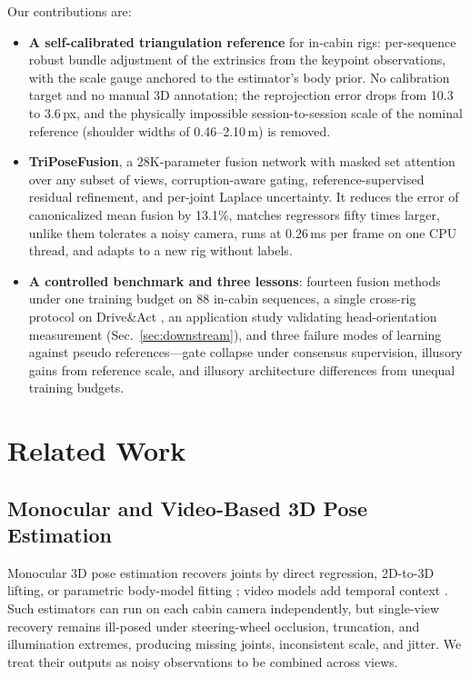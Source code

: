 \documentclass[journal]{IEEEtran}
\newcommand{\method}{TriPoseFusion}
\newcommand{\da}{Drive\&Act}
\begin{document}
Our contributions are:
\begin{itemize}
\item \textbf{A self-calibrated triangulation reference} for in-cabin rigs: per-sequence robust bundle adjustment of the extrinsics from the keypoint observations, with the scale gauge anchored to the estimator's body prior. No calibration target and no manual 3D annotation; the reprojection error drops from 10.3 to 3.6\,px, and the physically impossible session-to-session scale of the nominal reference (shoulder widths of 0.46--2.10\,m) is removed.
\item \textbf{\method{}}, a 28K-parameter fusion network with masked set attention over any subset of views, corruption-aware gating, reference-supervised residual refinement, and per-joint Laplace uncertainty. It reduces the error of canonicalized mean fusion by 13.1\%, matches regressors fifty times larger, unlike them tolerates a noisy camera, runs at 0.26\,ms per frame on one CPU thread, and adapts to a new rig without labels.
\item \textbf{A controlled benchmark and three lessons}: fourteen fusion methods under one training budget on 88 in-cabin sequences, a single cross-rig protocol on \da{} \cite{martin2019drive}, an application study validating head-orientation measurement (Sec.~\ref{sec:downstream}), and three failure modes of learning against pseudo references---gate collapse under consensus supervision, illusory gains from reference scale, and illusory architecture differences from unequal training budgets.
\end{itemize}

\section{Related Work}
\label{sec:related}

\subsection{Monocular and Video-Based 3D Pose Estimation}
Monocular 3D pose estimation recovers joints by direct regression, 2D-to-3D lifting, or parametric body-model fitting \cite{toshev2014deeppose,martinez2017simple,zhou2017towards,mehta2017vnect,kanazawa2018end}; video models add temporal context \cite{pavllo20193d,kocabas2020vibe}. Such estimators can run on each cabin camera independently, but single-view recovery remains ill-posed under steering-wheel occlusion, truncation, and illumination extremes, producing missing joints, inconsistent scale, and jitter. We treat their outputs as noisy observations to be combined across views.
\end{document}
